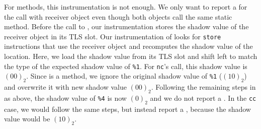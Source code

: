For methods, this instrumentation is not enough.
We only want to report a \wtc{} for the call with \const{} receiver object even
though both objects call the same static method.
Before the call to , our instrumentation stores the shadow value of
the receiver object in its TLS slot.
Our instrumentation of  looks for \texttt{store} instructions that use
the receiver object and recomputes the shadow value of the location.
Here, we load the shadow value from its TLS slot and shift left
to match the type of the expected shadow value of \texttt{\%1}.
For \texttt{nc}'s call, this shadow value is $(00)_2$.
Since  is a method, we ignore the original shadow value of
\texttt{\%1} ($(10)_2$) and overwrite it with new shadow value
$(00)_2$.
Following the remaining steps in  as above, the shadow value of
\texttt{\%4} is now $(0)_2$ and we do not report a \wtc{}.
In the \texttt{cc} case, we would follow the same steps, but instead report a
\wtc{}, because the shadow value would be $(10)_2$.

